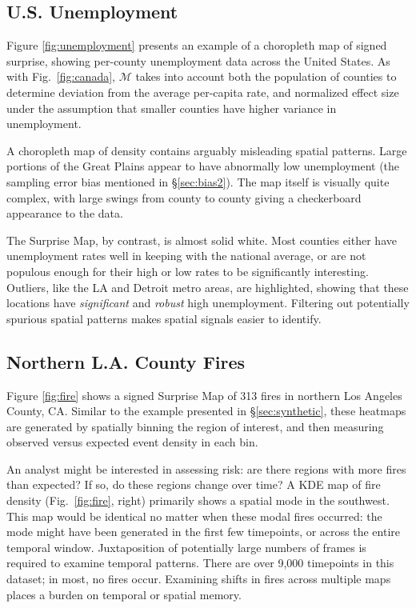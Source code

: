 \documentclass[journal]{vgtc}                %
\begin{document}
\fireFig
\unemploymentFig

\subsection{U.S. Unemployment}

Figure \ref{fig:unemployment} presents an example of a choropleth map of signed surprise, showing per-county unemployment data across the United States. As with Fig.~\ref{fig:canada}, $\mathcal{M}$ takes into account both the population of counties to determine deviation from the average per-capita rate, and normalized effect size under the assumption that smaller counties have higher variance in unemployment.

A choropleth map of density contains arguably misleading spatial patterns. Large portions of the Great Plains appear to have abnormally low unemployment (the sampling error bias mentioned in \S\ref{sec:bias2}). The map itself is visually quite complex, with large swings from county to county giving a checkerboard appearance to the data.

The Surprise Map, by contrast, is almost solid white. Most counties either have unemployment rates well in keeping with the national average, or are not populous enough for their high or low rates to be significantly interesting. Outliers, like the LA and Detroit metro areas, are highlighted, showing that these locations have \emph{significant} and \emph{robust} high unemployment. Filtering out potentially spurious spatial patterns makes spatial signals easier to identify.

\subsection{Northern L.A. County Fires}

Figure \ref{fig:fire} shows a signed Surprise Map of 313 fires in northern Los Angeles County, CA. Similar to the example presented in \S\ref{sec:synthetic}, these heatmaps are generated by spatially binning the region of interest, and then measuring observed versus expected event density in each bin.

An analyst might be interested in assessing risk: are there regions with more fires than expected? If so, do these regions change over time? A KDE map of fire density (Fig.~\ref{fig:fire}, right) primarily shows a spatial mode in the southwest. This map would be identical no matter when these modal fires occurred: the mode might have been generated in the first few timepoints, or across the entire temporal window. Juxtaposition of potentially large numbers of frames is required to examine temporal patterns. There are over 9,000 timepoints in this dataset; in most, no fires occur. Examining shifts in fires across multiple maps places a burden on temporal or spatial memory.
\end{document}
